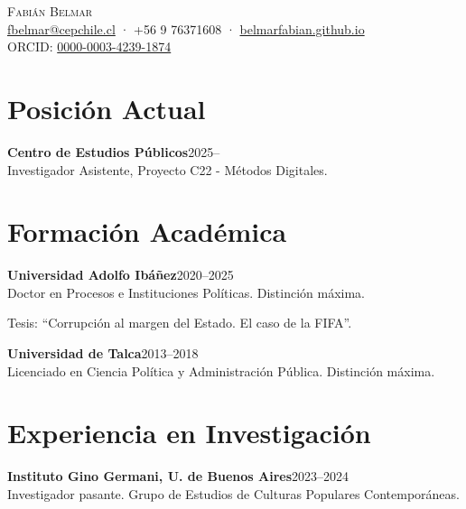 \documentclass[11pt,a4paper]{article}
\newcommand{\cvitem}[2]{\noindent\textbf{#1}\hfill #2\\[2pt]}
\newcommand{\cvdetail}[1]{\noindent\hspace{0.3cm}#1\par\vspace{4pt}}
\begin{document}
\begin{center}
{\Large\textsc{Fabián Belmar}}\\[6pt]
{\small
\href{mailto:fbelmar@cepchile.cl}{fbelmar@cepchile.cl} ·
+56 9 76371608 ·
\href{https://belmarfabian.github.io}{belmarfabian.github.io}
}\\[3pt]
{\footnotesize
ORCID: \href{https://orcid.org/0000-0003-4239-1874}{0000-0003-4239-1874}
}
\end{center}

\vspace{12pt}

\section{Posición Actual}

\cvitem{Centro de Estudios Públicos}{2025--}
\cvdetail{Investigador Asistente, Proyecto C22 - Métodos Digitales.}

\section{Formación Académica}

\cvitem{Universidad Adolfo Ibáñez}{2020--2025}
\cvdetail{Doctor en Procesos e Instituciones Políticas. Distinción máxima.}
\cvdetail{Tesis: ``Corrupción al margen del Estado. El caso de la FIFA''.}

\vspace{4pt}

\cvitem{Universidad de Talca}{2013--2018}
\cvdetail{Licenciado en Ciencia Política y Administración Pública. Distinción máxima.}

\section{Experiencia en Investigación}

\cvitem{Instituto Gino Germani, U. de Buenos Aires}{2023--2024}
\cvdetail{Investigador pasante. Grupo de Estudios de Culturas Populares Contemporáneas.}

\vspace{4pt}
\end{document}
